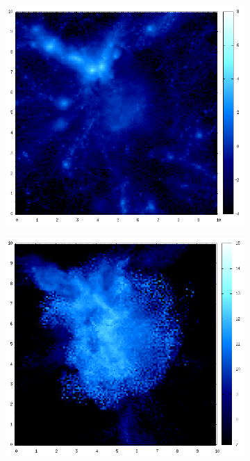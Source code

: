 \documentclass[journal]{IEEEtran}
\begin{document}
\begin{figure}[htb]
\begin{subfigure}[t]{0.25\textwidth}
	\end{subfigure}
	\quad
	\begin{subfigure}[t]{0.25\textwidth}
		\centering
		\includegraphics[width=\linewidth]{GAS06-07.png}
	\end{subfigure}
	\quad
	\begin{subfigure}[t]{0.25\textwidth}
		\centering
		\includegraphics[width=\linewidth]{TEMP06-07.png}

\end{subfigure}
\end{figure}
\end{document}

